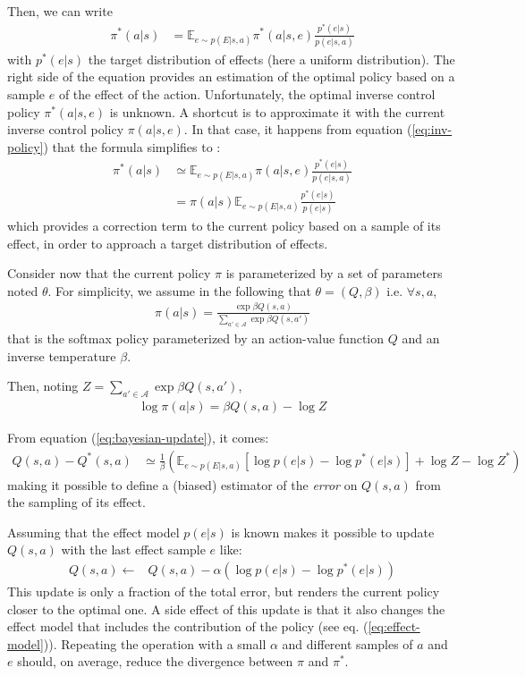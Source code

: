 \documentclass[runningheads]{llncs}
\begin{document}
Then, we can write 
\begin{align}
\pi^*(a|s) &= \mathbb{E}_{e\sim p(E|s,a)} \pi^*(a|s,e)\frac{p^*(e|s)}{p(e|s,a)}
\end{align}
with $p^*(e|s)$ the target distribution of effects (here a uniform distribution).
The right side of the equation provides an estimation of the optimal policy based on a sample $e$ of the effect of the action. Unfortunately, the optimal inverse control policy $\pi^*(a|s,e)$ is unknown. A shortcut is to approximate it with the current inverse control policy $\pi(a|s,e)$.
In that case, it happens from equation (\ref{eq:inv-policy}) that the formula simplifies to :
\begin{align}\label{eq:bayesian-update}
\pi^*(a|s) &\simeq \mathbb{E}_{e\sim p(E|s,a)} \pi(a|s,e)\frac{p^*(e|s)}{p(e|s,a)}\\
&= \pi(a|s) \mathbb{E}_{e\sim p(E|s,a)} \frac{p^*(e|s)}{p(e|s)}
\end{align}
which provides a correction term to the current policy based on a sample of its effect, in order to approach a target distribution of effects.

Consider now that the current policy $\pi$ is parameterized by a set of parameters noted $\theta$. For simplicity, we assume in the following that $\theta=(Q,\beta)$ i.e. $\forall s,a$,
\begin{align}
\pi(a|s) = \frac{\exp \beta Q(s,a)}{\sum_{a'\in \mathcal{A}} \exp \beta Q(s,a')}
\end{align}
that is the softmax policy parameterized by an action-value function $Q$ and an inverse temperature $\beta$.

Then, noting $Z= \sum_{a'\in \mathcal{A}} \exp \beta Q(s,a')$, 
\begin{align}
\log \pi(a|s) = \beta Q(s,a) - \log Z
\end{align}

From equation (\ref{eq:bayesian-update}), it comes:
\begin{align}
 Q(s,a) - Q^*(s,a) &\simeq %
 \frac{1}{\beta}  \left(\mathbb{E}_{e\sim p(E|s,a)} [\log p(e|s) - \log p^*(e|s)] + \log Z - \log Z^*\right) \label{eq:TD-err}
\end{align}
making it possible to define a (biased) estimator of the \emph{error} on $Q(s,a)$ from the sampling of its effect.

Assuming that the effect model $p(e|s)$ is known makes it possible to update $Q(s,a)$ with the last effect sample $e$ like:
\begin{align}\label{eq:Q-update}
Q(s,a) \leftarrow & Q(s,a) - \alpha (\log p(e|s) - \log p^*(e|s))
\end{align}  
This update is only a fraction of the total error, but renders the current policy closer to the optimal one. A side effect of this update is that it also changes the effect model that includes the contribution of the policy (see eq. (\ref{eq:effect-model})). Repeating the operation with a small $\alpha$ and different samples of $a$ and $e$ should, on average, reduce the divergence between $\pi$ and $\pi^*$.
\end{document}
